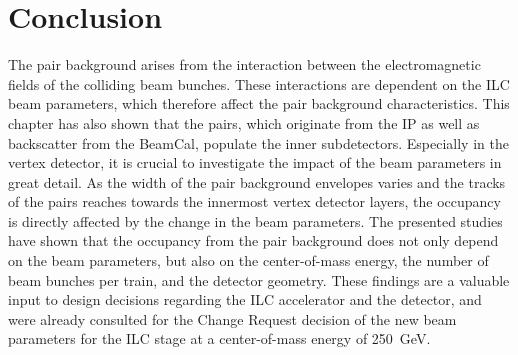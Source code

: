 \section{Conclusion}
The pair background arises from the interaction between the electromagnetic fields of the colliding beam bunches.
These interactions are dependent on the ILC beam parameters, which therefore affect the pair background characteristics.
This chapter has also shown that the pairs, which originate from the IP as well as backscatter from the BeamCal, populate the inner \sid subdetectors.
Especially in the vertex detector, it is crucial to investigate the impact of the beam parameters in great detail.
As the width of the pair background envelopes varies and the tracks of the pairs reaches towards the innermost vertex detector layers, the occupancy is directly affected by the change in the beam parameters.
The presented studies have shown that the occupancy from the pair background does not only depend on the beam parameters, but also on the center-of-mass energy, the number of beam bunches per train, and the \sid detector geometry.
These findings are a valuable input to design decisions regarding the ILC accelerator and the \sid detector, and were already consulted for the Change Request decision of the new beam parameters for the ILC stage at a center-of-mass energy of \SI{250}{\GeV}.